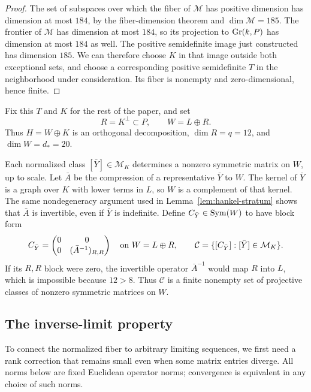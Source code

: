 \begin{proof}
The set of subspaces over which the fiber of $\mathcal M$ has positive
dimension has dimension at most $184$, by the fiber-dimension theorem
and $\dim\mathcal M=185$. The frontier of $\mathcal M$ has dimension
at most $184$, so its projection to $\operatorname{Gr}(k,P)$ has dimension at most
$184$ as well. The positive semidefinite image just constructed has
dimension $185$. We can therefore choose $K$ in that image outside
both exceptional sets, and choose a corresponding positive
semidefinite $T$ in the neighborhood under consideration. Its fiber
is nonempty and zero-dimensional, hence finite.
\end{proof}

Fix this $T$ and $K$ for the rest of the paper, and set
\begin{equation}
\label{eq:fixed-complements}
 R=K^\perp\subset P,\qquad W=L\oplus R.
\end{equation}
Thus $H=W\oplus K$ is an orthogonal decomposition, $\dim R=q=12$,
and $\dim W=d_*=20$.

Each normalized class $[\bar Y]\in\mathcal M_K$ determines a
nonzero symmetric matrix on $W$, up to scale. Let $\bar A$ be the
compression of a representative $\bar Y$ to $W$. The kernel of $\bar Y$
is a graph over $K$ with lower terms in $L$, so $W$ is a complement of
that kernel. The same nondegeneracy argument used in
Lemma~\ref{lem:hankel-stratum} shows that $\bar A$ is invertible,
even if $\bar Y$ is indefinite. Define $C_{\bar Y}\in\operatorname{Sym}(W)$ to
have block form
\begin{equation}
\label{eq:finite-inverse-directions}
 C_{\bar Y}=
 \begin{pmatrix}0&0\\0&(\bar A^{-1})_{R,R}\end{pmatrix}
 \quad\hbox{on }W=L\oplus R,
 \qquad
 \mathcal C=\{[C_{\bar Y}]:[\bar Y]\in\mathcal M_K\}.
\end{equation}
If its $R,R$ block were zero, the invertible operator $\bar A^{-1}$
would map $R$ into $L$, which is impossible because $12>8$.
Thus $\mathcal C$ is a finite nonempty set of projective classes of
nonzero symmetric matrices on $W$.

\subsection{The inverse-limit property}

To connect the normalized fiber to arbitrary limiting sequences, we
first need a rank correction that remains small even when some
matrix entries diverge. All norms below are fixed Euclidean operator
norms; convergence is equivalent in any choice of such norms.

